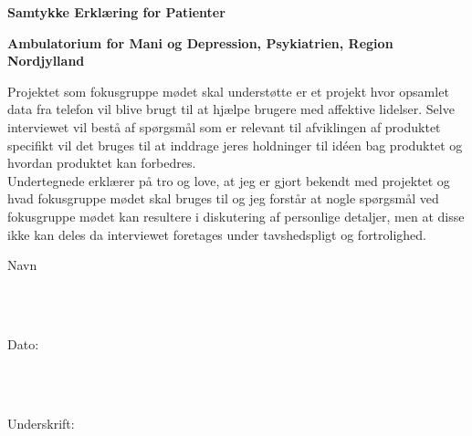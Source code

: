 


\vspace{5cm}

{\centering \Large \textbf{Samtykke Erklæring for Patienter} \\ \vspace{2cm}}

{\centering \large \textbf{Ambulatorium for Mani og Depression, Psykiatrien, Region Nordjylland} \\ \vspace{2cm}}


\noindent
Projektet som fokusgruppe mødet skal understøtte er et projekt hvor opsamlet data fra telefon vil blive brugt til at hjælpe brugere med affektive lidelser. Selve interviewet vil bestå af spørgsmål som er relevant til afviklingen af produktet specifikt vil det bruges til at inddrage jeres holdninger til idéen bag produktet og hvordan produktet kan forbedres. \\ 

\noindent
Undertegnede erklærer på tro og love, at jeg er gjort bekendt med projektet og hvad fokusgruppe mødet skal bruges til og jeg forstår at nogle spørgsmål ved fokusgruppe mødet kan resultere i diskutering af personlige detaljer, men at disse ikke kan deles da interviewet foretages under tavshedspligt og fortrolighed.

\vspace{1cm}
\noindent
\vspace{5mm}
\parbox[h]{2cm}{Navn}\hspace{0.5cm} \makebox[7cm]{\hrulefill} \\ \\
\vspace{5mm}
\parbox[h]{2cm}{Dato:}\hspace{0.5cm} \makebox[7cm]{\hrulefill} \\ \\
\vspace{5mm}
\parbox[h]{2cm}{Underskrift: }\hspace{0.5cm} \makebox[7cm]{\hrulefill} \\ \\
\vspace{5mm}

